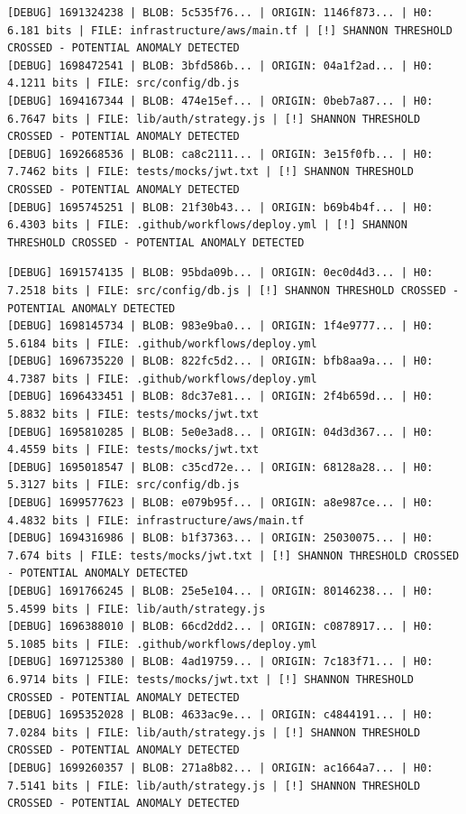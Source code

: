 \documentclass[12pt, a4paper, oneside]{report}
\begin{document}
\begin{lstlisting}[basicstyle=\tiny\ttfamily]
[DEBUG] 1691324238 | BLOB: 5c535f76... | ORIGIN: 1146f873... | H0: 6.181 bits | FILE: infrastructure/aws/main.tf | [!] SHANNON THRESHOLD CROSSED - POTENTIAL ANOMALY DETECTED
[DEBUG] 1698472541 | BLOB: 3bfd586b... | ORIGIN: 04a1f2ad... | H0: 4.1211 bits | FILE: src/config/db.js
[DEBUG] 1694167344 | BLOB: 474e15ef... | ORIGIN: 0beb7a87... | H0: 6.7647 bits | FILE: lib/auth/strategy.js | [!] SHANNON THRESHOLD CROSSED - POTENTIAL ANOMALY DETECTED
[DEBUG] 1692668536 | BLOB: ca8c2111... | ORIGIN: 3e15f0fb... | H0: 7.7462 bits | FILE: tests/mocks/jwt.txt | [!] SHANNON THRESHOLD CROSSED - POTENTIAL ANOMALY DETECTED
[DEBUG] 1695745251 | BLOB: 21f30b43... | ORIGIN: b69b4b4f... | H0: 6.4303 bits | FILE: .github/workflows/deploy.yml | [!] SHANNON THRESHOLD CROSSED - POTENTIAL ANOMALY DETECTED
\end{lstlisting}
\begin{lstlisting}[basicstyle=\tiny\ttfamily]
[DEBUG] 1691574135 | BLOB: 95bda09b... | ORIGIN: 0ec0d4d3... | H0: 7.2518 bits | FILE: src/config/db.js | [!] SHANNON THRESHOLD CROSSED - POTENTIAL ANOMALY DETECTED
[DEBUG] 1698145734 | BLOB: 983e9ba0... | ORIGIN: 1f4e9777... | H0: 5.6184 bits | FILE: .github/workflows/deploy.yml
[DEBUG] 1696735220 | BLOB: 822fc5d2... | ORIGIN: bfb8aa9a... | H0: 4.7387 bits | FILE: .github/workflows/deploy.yml
[DEBUG] 1696433451 | BLOB: 8dc37e81... | ORIGIN: 2f4b659d... | H0: 5.8832 bits | FILE: tests/mocks/jwt.txt
[DEBUG] 1695810285 | BLOB: 5e0e3ad8... | ORIGIN: 04d3d367... | H0: 4.4559 bits | FILE: tests/mocks/jwt.txt
[DEBUG] 1695018547 | BLOB: c35cd72e... | ORIGIN: 68128a28... | H0: 5.3127 bits | FILE: src/config/db.js
[DEBUG] 1699577623 | BLOB: e079b95f... | ORIGIN: a8e987ce... | H0: 4.4832 bits | FILE: infrastructure/aws/main.tf
[DEBUG] 1694316986 | BLOB: b1f37363... | ORIGIN: 25030075... | H0: 7.674 bits | FILE: tests/mocks/jwt.txt | [!] SHANNON THRESHOLD CROSSED - POTENTIAL ANOMALY DETECTED
[DEBUG] 1691766245 | BLOB: 25e5e104... | ORIGIN: 80146238... | H0: 5.4599 bits | FILE: lib/auth/strategy.js
[DEBUG] 1696388010 | BLOB: 66cd2dd2... | ORIGIN: c0878917... | H0: 5.1085 bits | FILE: .github/workflows/deploy.yml
[DEBUG] 1697125380 | BLOB: 4ad19759... | ORIGIN: 7c183f71... | H0: 6.9714 bits | FILE: tests/mocks/jwt.txt | [!] SHANNON THRESHOLD CROSSED - POTENTIAL ANOMALY DETECTED
[DEBUG] 1695352028 | BLOB: 4633ac9e... | ORIGIN: c4844191... | H0: 7.0284 bits | FILE: lib/auth/strategy.js | [!] SHANNON THRESHOLD CROSSED - POTENTIAL ANOMALY DETECTED
[DEBUG] 1699260357 | BLOB: 271a8b82... | ORIGIN: ac1664a7... | H0: 7.5141 bits | FILE: lib/auth/strategy.js | [!] SHANNON THRESHOLD CROSSED - POTENTIAL ANOMALY DETECTED

\end{lstlisting}
\end{document}
